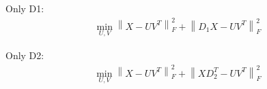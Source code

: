 \documentclass[11pt]{article}
\begin{document}
Only D1:
\begin{multline}
\min_{U,V}\left\lVert X - UV^T \right\rVert^{2}_F + \left\lVert D_{1}X - UV^T \right\rVert^{2}_F
\end{multline}

Only D2:
\begin{multline}
\min_{U,V}\left\lVert X - UV^T \right\rVert^{2}_F + \left\lVert XD^{T}_2 - UV^T \right\rVert^{2}_F
\end{multline}




\end{document}
